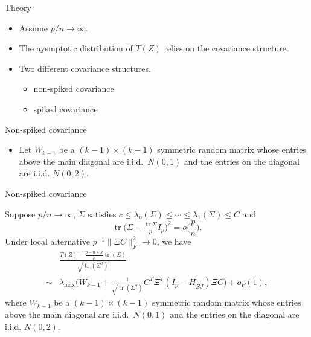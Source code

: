 \documentclass{beamer}
\DeclareMathOperator{\mytr}{tr}
\theoremstyle{plain}
\theoremstyle{definition}
\theoremstyle{remark}
\begin{document}
\begin{frame}{Theory}
\begin{itemize}
    \item
Assume $p/n\to \infty$.
    \item
        The aysmptotic distribution of $T(Z)$ relies on the covariance structure.
    \item
        Two different covariance structures.
        \begin{itemize}
            \item
                non-spiked covariance
            \item
                spiked covariance
        \end{itemize}
\end{itemize}
\end{frame}
\begin{frame}{Non-spiked covariance}

\begin{itemize}
\item
Let $W_{k-1}$ be a $(k-1)\times (k-1)$ symmetric random matrix whose entries above the main diagonal are i.i.d.\ $N(0,1)$ and the entries on the diagonal are i.i.d. $N(0,2)$.
\end{itemize}
\end{frame}
\begin{frame}{Non-spiked covariance}
    \begin{theorem}\label{theorem1}
        Suppose $p/n\to \infty$, $\Sigma$ satisfies $c\leq \lambda_p(\Sigma)\leq \cdots \leq \lambda_1(\Sigma)\leq C$ and
        $$
        \mytr\Big(\Sigma-\tfrac{\mytr \Sigma}{p} I_p\Big)^2 =o\big(\frac{p}{n}\big).
        $$
        Under local alternative
        $
        p^{-1}\|\Xi C\|_F^2\to 0
        $,
        we have
        \begin{align*}
            &\frac{T(Z)-\tfrac{p-n+k}{p}\mytr(\Sigma)}{\sqrt{\mytr(\Sigma^2)}}
            \\
            \sim
            &
            \lambda_{\max}\Big( W_{k-1}+ \frac{1}{\sqrt{\mytr(\Sigma^2)}} C^T \Xi^T (I_p-H_{Z\tilde{J}})\Xi C\Big)
            +o_P(1),
        \end{align*}
where $W_{k-1}$ be a $(k-1)\times (k-1)$ symmetric random matrix whose entries above the main diagonal are i.i.d.\ $N(0,1)$ and the entries on the diagonal are i.i.d. $N(0,2)$.
    \end{theorem}
\end{frame}
\end{document}
